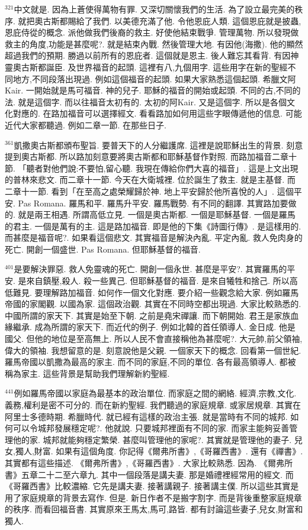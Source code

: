 \documentclass{book}
\begin{document}
$^{321}$中文就是.
因為上蒼使得萬物有罪.
又深切關懷我們的生活.
為了設立最完美的秩序.
就把奧古斯都賜給了我們.
以美德充滿了他.
令他恩庇人類.
這個恩庇就是披蟲,恩庇侍從的概念.
派他做我們後裔的救主.
好使他結束戰爭.
管理萬物.
所以發現做救主的角度,功能是甚麼呢?.
就是結束內戰.
然後管理大地.
有因他(海撒).
他的顯然超過我們的預期.
勝過以前所有的恩庇者.
這個就是恩主.
後人難忘其看背.
有因神靈奧古斯都誕臣.
及世界福音的起頭.
這裡有八,九個用字.
這些用字在新的聖經不同地方,不同段落出現過.
例如這個福音的起頭.
如果大家熟悉這個起頭.
希臘文阿Kair.
一開始就是馬可福音.
神的兒子.
耶穌的福音的開始或起頭.
不同的古,不同的法.
就是這個字.
而以往福音太初有的.
太初的阿Kair.
又是這個字.
所以是各個文化對應的.
在路加福音可以選擇經文.
看看路加如何用這些字眼傳遞他的信息.
可能近代大家都聽過.
例如二章一節.
在那些日子.

$^{361}$凱撒奧古斯都頒布聖旨.
要普天下的人分繼護席.
這裡是說耶穌出生的背景.
刻意提到奧古斯都.
所以路加刻意要將奧古斯都和耶穌基督作對照.
而路加福音二章十節.
「聽者對他們說:不要怕,留心聽.
我現在傳給你們大喜的福音」.
這是上文出現的普林來悲文.
而二章十一節.
今天在大衛城裡.
位於誕生了救主.
就是主基督.
而二章十一節.
看到「在至高之處榮耀歸於神.
地上平安歸於他所喜悅的人」.
這個平安.
Pas Romana.
羅馬和平.
羅馬升平安.
羅馬戰勢.
有不同的翻譯.
其實路加要做的.
就是兩王相遇.
所謂高低立見.
一個是奧古斯都.
一個是耶穌基督.
一個是羅馬的君主.
一個是萬有的主.
這是路加福音.
即是他的下集《詩圖行傳》.
是這樣用的.
而甚麼是福音呢?.
如果看這個悲文.
其實福音是解決內亂.
平定內亂.
救人免肉身的死亡.
開創一個盛世.
Pas Romana.
但耶穌基督的福音.

$^{401}$是要解決罪惡.
救人免靈魂的死亡.
開創一個永世.
甚麼是平安?.
其實羅馬的平安.
是來自鎮壓,殺人.
殺一些異己.
但耶穌基督的福音.
是來自犧牲和捨己.
所以高低難見.
要理解路加福音.
如何作一個文化對應.
要介紹一些觀念給大家.
例如羅馬帝國的家閣觀.
以國為家.
這個政治觀.
其實在不同時空都出現過.
大家比較熟悉的.
中國所謂的家天下.
其實是始至下朝.
之前是堯宋禪讓.
而下朝開始.
君王是家族血緣繼承.
成為所謂的家天下.
而近代的例子.
例如北韓的首任領導人.
金日成.
他是國父.
但他的地位是至高無上.
所以人民不會直接稱他為甚麼呢?.
大元帥,前父領袖,偉大的領袖.
我想留意的是.
刻意說他是父親.
一個家天下的概念.
回看第一個世紀.
羅馬帝國以凱撒為最高的家主.
而不同的家庭,不同的單位.
各有最高領導人.
都被稱為家主.
這些背景是幫助我們理解新約聖經.

$^{441}$例如羅馬帝國以家庭為最基本的政治單位.
而家庭之間的網絡.
經濟,宗教,文化.
義務,權利是密不可分的.
而在新約聖經.
我們聽過的家庭規章.
或家居規章.
其實在阿里士多德時期.
希臘時代.
就已經有這樣的政治主張.
就是當時有不同的城邦.
如何可以令城邦發展穩定呢?.
他就說.
只要城邦裡面有不同的家.
而家主能夠妥善管理他的家.
城邦就能夠穩定繁榮.
甚麼叫管理他的家呢?.
其實就是管理他的妻子.
兒女,獨人,財富.
如果有這個角度.
你記得《爾弗所書》,《哥羅西書》.
還有《禪書》.
其實都有這些描述.
《爾弗所書》,《哥羅西書》.
大家比較熟悉.
因為.
《爾弗所書》五章二十二至六章九.
其中一個段落是講夫妻.
那是婚禮裡經常用的經文.
而《哥羅西書》比較濃縮.
它先是講夫妻.
接著講親子.
接著講主僕.
所以這些其實是用了家庭規章的背景去寫作.
但是.
新日作者不是搬字割字.
而是背後重整家庭規章的秩序.
而看回福音書.
其實原來王馬太,馬可,路皆.
都有討論這些妻子,兒女,財富和獨人.
\end{document}
